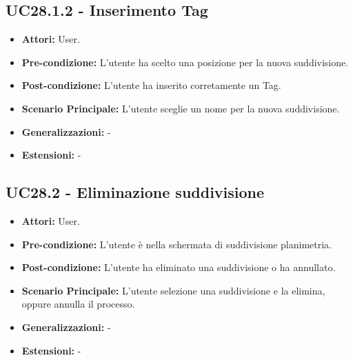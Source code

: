 \subsection{UC28.1.2 - Inserimento Tag}
\begin{itemize}
    \item \textbf{Attori:} User.
    \item \textbf{Pre-condizione:}  L'utente ha scelto una posizione per la nuova suddivisione.
    \item \textbf{Post-condizione:} L'utente ha inserito corretamente un Tag.
    \item \textbf{Scenario Principale:} L'utente sceglie un nome per la nuova suddivisione.
    \item \textbf{Generalizzazioni:} -
    \item \textbf{Estensioni:} -
\end{itemize}

\subsection{UC28.2 - Eliminazione suddivisione}
\begin{itemize}
    \item \textbf{Attori:} User.
    \item \textbf{Pre-condizione:}  L'utente è nella schermata di suddivisione planimetria.
    \item \textbf{Post-condizione:} L'utente ha eliminato una suddivisione o ha annullato.
    \item \textbf{Scenario Principale:} L'utente selezione una suddivisione e la elimina, oppure annulla il processo.
    \item \textbf{Generalizzazioni:} -
    \item \textbf{Estensioni:} -
\end{itemize}

